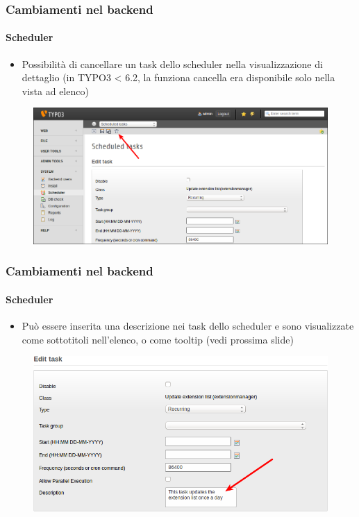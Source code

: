 
\begin{frame}[fragile]
	\frametitle{Cambiamenti nel backend}
	\framesubtitle{Scheduler}

	\begin{itemize}
		\item Possibilità di cancellare un task dello scheduler nella visualizzazione di dettaglio
			\small(in TYPO3 < 6.2, la funziona cancella era disponibile solo nella vista ad elenco)\normalsize
	\end{itemize}

	\begin{figure}
		\includegraphics[width=0.95\linewidth]{Images/BackendChanges/DeleteSchedulerTaskInEditView.png}
	\end{figure}

\end{frame}


\begin{frame}[fragile]
	\frametitle{Cambiamenti nel backend}
	\framesubtitle{Scheduler}

	\begin{itemize}
		\item Può essere inserita una descrizione nei task dello scheduler e sono visualizzate come sottotitoli nell'elenco, o come tooltip (vedi prossima slide)
	\end{itemize}

	\begin{figure}
		\includegraphics[width=0.7\linewidth]{Images/BackendChanges/SchedulerTaskDescription.png}
	\end{figure}

\end{frame}


